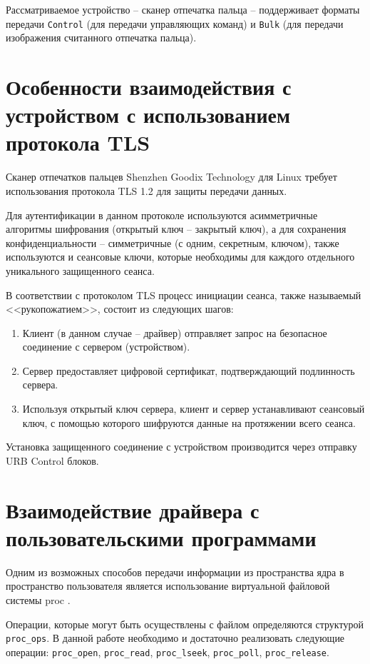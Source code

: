 Рассматриваемое устройство -- сканер отпечатка пальца -- поддерживает форматы передачи \texttt{Control} (для передачи управляющих команд) и \texttt{Bulk} (для передачи изображения считанного отпечатка пальца).

\section{Особенности взаимодействия с устройством с использованием протокола TLS}

Сканер отпечатков пальцев Shenzhen Goodix Technology для Linux требует использования протокола TLS \cite{tls} 1.2 для защиты передачи данных.

Для аутентификации в данном протоколе используются асимметричные алгоритмы
шифрования \cite{encryption} (открытый ключ -- закрытый ключ), а для сохранения конфиденциальности --
симметричные (с одним, секретным, ключом), также используются и сеансовые ключи, которые
необходимы для каждого отдельного уникального защищенного сеанса.

В соответствии с протоколом TLS процесс инициации сеанса, также называемый <<рукопожатием>>, состоит из следующих шагов:

\begin{enumerate}
    \item Клиент (в данном случае -- драйвер) отправляет запрос на безопасное соединение с сервером (устройством).
    \item Сервер предоставляет цифровой сертификат, подтверждающий подлинность сервера.
    \item Используя открытый ключ сервера, клиент и сервер устанавливают сеансовый ключ, с помощью которого шифруются данные на протяжении всего сеанса.
\end{enumerate}

Установка защищенного соединение с устройством производится через отправку URB Control блоков.

\section{Взаимодействие драйвера с пользовательскими программами}

Одним из возможных способов передачи информации из пространства ядра в пространство пользователя является использование виртуальной файловой системы proc \cite{vfs-proc}.

Операции, которые могут быть осуществлены с файлом определяются структурой \texttt{proc\_ops}. В данной работе необходимо и достаточно реализовать следующие операции: \texttt{proc\_open}, \texttt{proc\_read}, \texttt{proc\_lseek}, \texttt{proc\_poll}, \texttt{proc\_release}.

